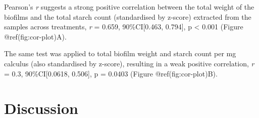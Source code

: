 \documentclass[
  letterpaper,
]{book}
\begin{document}
Pearson's \emph{r} suggests a strong positive correlation between the
total weight of the biofilms and the total starch count (standardised by
z-score) extracted from the samples across treatments, \emph{r} = 0.659,
90\%CI{[}0.463, 0.794{]}, p \textless{} 0.001 (Figure
@ref(fig:cor-plot)A).

The same test was applied to total biofilm weight and starch count per
mg calculus (also standardised by z-score), resulting in a weak positive
correlation, \emph{r} = 0.3, 90\%CI{[}0.0618, 0.506{]}, p = 0.0403
(Figure @ref(fig:cor-plot)B).


\hypertarget{discussion-1}{%
\chapter{Discussion}\label{discussion-1}}
\end{document}
